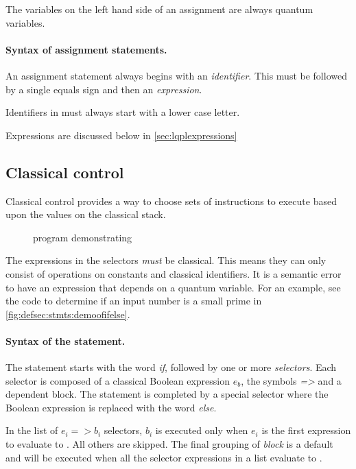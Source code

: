 The variables  on the left hand side of an
assignment are always quantum variables.
\paragraph{Syntax of assignment statements.} An assignment statement always
begins with an \emph{identifier}. This
must be followed by a single equals sign and then an \emph{expression}.

Identifiers in \lqpl{} must always start with a lower case letter.

Expressions are discussed below in \vref{sec:lqplexpressions}

\subsection{Classical control}\label{subsec:classicalcontrolstatements}
Classical control provides a way to choose sets of instructions
to execute based upon the values on the classical stack. 

\begin{figure}[htbp]
\begin{singlespace}

\end{singlespace}
\caption{\lqpl{} program demonstrating }
\label{fig:defsec:stmts:demoofifelse}
\end{figure}

The expressions in the selectors 
\emph{must} be classical. This means they can only consist of
operations on  constants and classical identifiers. 
It is a semantic error to 
have an expression that depends on a
quantum variable. For an example, see the code to determine if
an input number is a small prime in \vref{fig:defsec:stmts:demoofifelse}.

\paragraph{Syntax of the   statement.} 
The statement starts
with the word \emph{if}, followed by one or more \emph{selectors}.
Each selector is composed of a classical Boolean expression $e_b$, the
symbols \emph{=>} and a dependent block. 
 The statement is 
completed by a special selector where the Boolean expression is
replaced with the word \emph{else}. 

In the list of $e_i => b_i$ selectors, 
$b_i$ is executed only when $e_i$ is the first expression to
evaluate to . All others are skipped. The final 
grouping of  \emph{block} is a default and will be
executed when all the  selector expressions in a list
  evaluate to .


